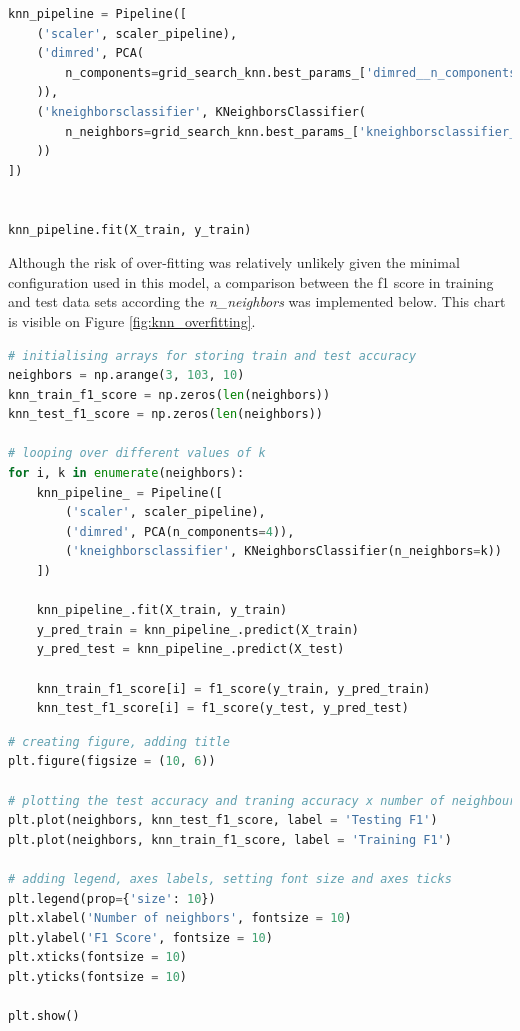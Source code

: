 \documentclass{article}
\begin{document}
\begin{lstlisting}[language=Python]
knn_pipeline = Pipeline([
    ('scaler', scaler_pipeline), 
    ('dimred', PCA(
        n_components=grid_search_knn.best_params_['dimred__n_components']
    )),
    ('kneighborsclassifier', KNeighborsClassifier(
        n_neighbors=grid_search_knn.best_params_['kneighborsclassifier__n_neighbors']
    ))
])


knn_pipeline.fit(X_train, y_train)
\end{lstlisting}

Although the risk of over-fitting was relatively unlikely given the minimal configuration used in this model, a comparison between the f1 score in training and test data sets according the \emph{n\_neighbors} was implemented below. This chart is visible on Figure \ref{fig:knn_overfitting}.

\begin{lstlisting}[language=Python]
# initialising arrays for storing train and test accuracy
neighbors = np.arange(3, 103, 10)     
knn_train_f1_score = np.zeros(len(neighbors))    
knn_test_f1_score = np.zeros(len(neighbors))    

# looping over different values of k
for i, k in enumerate(neighbors):     
    knn_pipeline_ = Pipeline([
        ('scaler', scaler_pipeline), 
        ('dimred', PCA(n_components=4)), 
        ('kneighborsclassifier', KNeighborsClassifier(n_neighbors=k))
    ])
    
    knn_pipeline_.fit(X_train, y_train)                             
    y_pred_train = knn_pipeline_.predict(X_train)
    y_pred_test = knn_pipeline_.predict(X_test)
    
    knn_train_f1_score[i] = f1_score(y_train, y_pred_train)    
    knn_test_f1_score[i] = f1_score(y_test, y_pred_test)   
\end{lstlisting}

\begin{lstlisting}[language=Python]
# creating figure, adding title
plt.figure(figsize = (10, 6))

# plotting the test accuracy and traning accuracy x number of neighbours
plt.plot(neighbors, knn_test_f1_score, label = 'Testing F1')
plt.plot(neighbors, knn_train_f1_score, label = 'Training F1')

# adding legend, axes labels, setting font size and axes ticks
plt.legend(prop={'size': 10})
plt.xlabel('Number of neighbors', fontsize = 10)
plt.ylabel('F1 Score', fontsize = 10)
plt.xticks(fontsize = 10)
plt.yticks(fontsize = 10)

plt.show()
\end{lstlisting}
\end{document}
